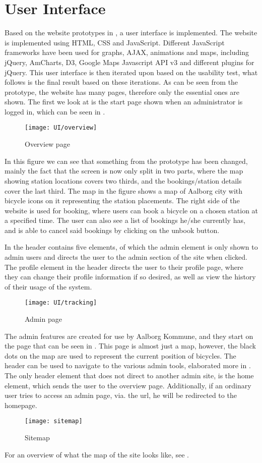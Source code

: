 \section{User Interface}

Based on the website prototypes in , a user interface is implemented.
The website is implemented using HTML, CSS and JavaScript. 
Different JavaScript frameworks have been used for graphs, AJAX, animations and maps, including jQuery, AmCharts, D3, Google Maps Javascript API v3 and different plugins for jQuery.
This user interface is then iterated upon based on the usability test, what follows is the final result based on these iterations. 
As can be seen from the prototype, the website has many pages, therefore only the essential ones are shown.
The first we look at is the start page shown when an administrator is logged in, which can be seen in .

\begin{figure}[h]
	\centering
	\texttt{[image: UI/overview]}
	\caption{Overview page}\label{fig:UI-overview}
\end{figure}

In this figure we can see that something from the prototype has been changed, mainly the fact that the screen is now only split in two parts, where the map showing station locations covers two thirds, and the bookings/station details cover the last third.
The map in the figure shows a map of Aalborg city with bicycle icons on it representing the station placements.
The right side of the website is used for booking, where users can book a bicycle on a chosen station at a specified time.
The user can also see a list of bookings he/she currently has, and is able to cancel said bookings by clicking on the unbook button.

In  the header contains five elements, of which the admin element is only shown to admin users and directs the user to the admin section of the site when clicked.
The profile element in the header directs the user to their profile page, where they can change their profile information if so desired, as well as view the history of their usage of the system.

\begin{figure}[h]
	\centering
	\texttt{[image: UI/tracking]}
	\caption{Admin page}\label{fig:UI-admin}
\end{figure}

The admin features are created for use by Aalborg Kommune, and they start on the page that can be seen in .
This page is almost just a map, however, the black dots on the map are used to represent the current position of bicycles.
The header can be used to navigate to the various admin tools, elaborated more in .
The only header element that does not direct to another admin site, is the home element, which sends the user to the overview page.
Additionally, if an ordinary user tries to access an admin page, via. the url, he will be redirected to the homepage.

\begin{figure}[h]
	\centering
	\texttt{[image: sitemap]}
	\caption{Sitemap}\label{fig:sitemap}
\end{figure}

For an overview of what the map of the site looks like, see .
